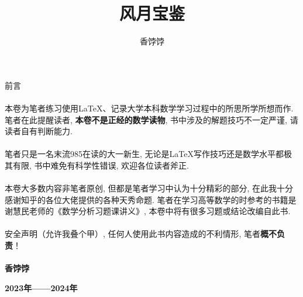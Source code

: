 \documentclass[10pt,a5paper]{book}
\title{\Huge 风月宝鉴}
\author{香饽饽}
\date{}
\theoremstyle{thmstyle} %
\theoremstyle{defstyle} %
\theoremstyle{prostyle} %
\begin{document}
	\begin{titlepage}	
	\end{titlepage}
	
	\maketitle
	
	
	\frontmatter
	\begin{center}
		{\Huge 前言} \\
	\end{center}
	\paragraph{}
	\paragraph{}\quad 本卷为笔者练习使用\LaTeX 、记录大学本科数学学习过程中的所思所学所想而作. 笔者在此提醒读者, \textbf{本卷不是正经的数学读物}, 书中涉及的解题技巧不一定严谨, 请读者自有判断能力.
	\paragraph{}\quad 笔者只是一名末流985在读的大一新生, 无论是\LaTeX 写作技巧还是数学水平都极其有限, 书中难免有科学性错误, 欢迎各位读者斧正.
	\paragraph{}\quad 本卷大多数内容非笔者原创, 但都是笔者学习中认为十分精彩的部分, 在此我十分感谢知乎的各位大佬提供的各种天秀命题. 笔者在学习高等数学的时参考的书籍是谢慧民老师的《数学分析习题课讲义》, 本卷中将有很多习题或结论改编自此书.
	
	\paragraph{}\quad 安全声明（允许我叠个甲）, 任何人使用此书内容造成的不利情形, 笔者\textbf{概不负责}！
	
	\paragraph{}
	
	\paragraph{}
	
	\hfill \textbf{香饽饽}\quad\quad\enspace\:
	
	\hfill \textbf{2023年——2024年}
	
	
	\tableofcontents
	
	\clearpage
	
	\mainmatter
	\setcounter{page}{1} %
	
	
\end{document}
